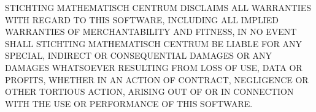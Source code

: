 STICHTING MATHEMATISCH CENTRUM DISCLAIMS ALL WARRANTIES WITH REGARD TO
THIS SOFTWARE, INCLUDING ALL IMPLIED WARRANTIES OF MERCHANTABILITY AND
FITNESS, IN NO EVENT SHALL STICHTING MATHEMATISCH CENTRUM BE LIABLE
FOR ANY SPECIAL, INDIRECT OR CONSEQUENTIAL DAMAGES OR ANY DAMAGES
WHATSOEVER RESULTING FROM LOSS OF USE, DATA OR PROFITS, WHETHER IN AN
ACTION OF CONTRACT, NEGLIGENCE OR OTHER TORTIOUS ACTION, ARISING OUT
OF OR IN CONNECTION WITH THE USE OR PERFORMANCE OF THIS SOFTWARE.



